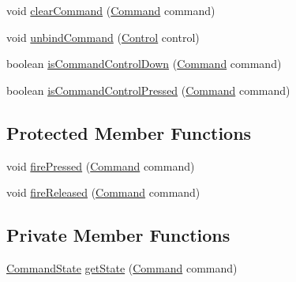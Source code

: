 \begin{DoxyCompactItemize}
void \mbox{\hyperlink{classorg_1_1newdawn_1_1slick_1_1command_1_1_input_provider_a0d501c7aae3af7e873195b3b3be6f167}{clear\+Command}} (\mbox{\hyperlink{interfaceorg_1_1newdawn_1_1slick_1_1command_1_1_command}{Command}} command)
\item 
void \mbox{\hyperlink{classorg_1_1newdawn_1_1slick_1_1command_1_1_input_provider_a4c5a3cae6a8b19d53b8a3419d856d449}{unbind\+Command}} (\mbox{\hyperlink{interfaceorg_1_1newdawn_1_1slick_1_1command_1_1_control}{Control}} control)
\item 
boolean \mbox{\hyperlink{classorg_1_1newdawn_1_1slick_1_1command_1_1_input_provider_a68409d18dded86e1d03b62f33b7e573a}{is\+Command\+Control\+Down}} (\mbox{\hyperlink{interfaceorg_1_1newdawn_1_1slick_1_1command_1_1_command}{Command}} command)
\item 
boolean \mbox{\hyperlink{classorg_1_1newdawn_1_1slick_1_1command_1_1_input_provider_a6d760d52392ef0a9d996d5a9dfe777b8}{is\+Command\+Control\+Pressed}} (\mbox{\hyperlink{interfaceorg_1_1newdawn_1_1slick_1_1command_1_1_command}{Command}} command)
\end{DoxyCompactItemize}
\subsection*{Protected Member Functions}
\begin{DoxyCompactItemize}
\item 
void \mbox{\hyperlink{classorg_1_1newdawn_1_1slick_1_1command_1_1_input_provider_a82cd36086b5780ccce446717e8075e96}{fire\+Pressed}} (\mbox{\hyperlink{interfaceorg_1_1newdawn_1_1slick_1_1command_1_1_command}{Command}} command)
\item 
void \mbox{\hyperlink{classorg_1_1newdawn_1_1slick_1_1command_1_1_input_provider_afede03e3ab95cb0248635cf64de6874c}{fire\+Released}} (\mbox{\hyperlink{interfaceorg_1_1newdawn_1_1slick_1_1command_1_1_command}{Command}} command)
\end{DoxyCompactItemize}
\subsection*{Private Member Functions}
\begin{DoxyCompactItemize}
\item 
\mbox{\hyperlink{classorg_1_1newdawn_1_1slick_1_1command_1_1_input_provider_1_1_command_state}{Command\+State}} \mbox{\hyperlink{classorg_1_1newdawn_1_1slick_1_1command_1_1_input_provider_aa25975d0cc21a4d1a45995c553e72357}{get\+State}} (\mbox{\hyperlink{interfaceorg_1_1newdawn_1_1slick_1_1command_1_1_command}{Command}} command)
\end{DoxyCompactItemize}
